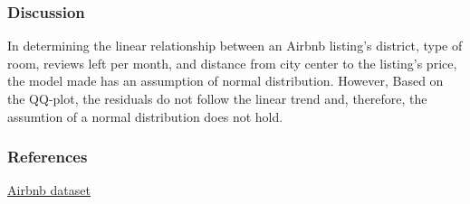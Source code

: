 \documentclass[]{article}
\begin{document}
\hypertarget{discussion}{%
\subsubsection{Discussion}\label{discussion}}

In determining the linear relationship between an Airbnb listing's
district, type of room, reviews left per month, and distance from city
center to the listing's price, the model made has an assumption of
normal distribution. However, Based on the QQ-plot, the residuals do not
follow the linear trend and, therefore, the assumtion of a normal
distribution does not hold.

\hypertarget{references}{%
\subsubsection{References}\label{references}}

\href{http://insideairbnb.com/get-the-data.html}{Airbnb dataset}
\end{document}
